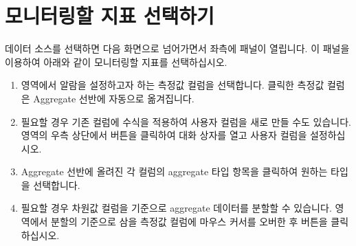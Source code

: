 \documentclass[letterpaper,10pt,english]{sphinxmanual}
\begin{document}
\section{모니터링할 지표 선택하기}
\label{\detokenize{part02/index:select-columns}}\label{\detokenize{part02/index:id3}}
데이터 소스를 선택하면 다음 화면으로 넘어가면서 좌측에  패널이 열립니다. 이 패널을 이용하여 아래와 같이 모니터링할 지표를 선택하십시오.
\begin{enumerate}
%
\item {} 
 영역에서 알람을 설정하고자 하는 측정값 컬럼을 선택합니다. 클릭한 측정값 컬럼은 Aggregate 선반에 자동으로 옮겨집니다.
\begin{quote}

\begin{figure}[H]
\centering

\noindent{}
\end{figure}
\end{quote}

\item {} 
필요할 경우 기존 컬럼에 수식을 적용하여 사용자 컬럼을 새로 만들 수도 있습니다.  영역의 우측 상단에서  버튼을 클릭하여 대화 상자를 열고 사용자 컬럼을 설정하십시오.
\begin{quote}

\begin{figure}[H]
\centering

\noindent{}
\end{figure}
\end{quote}

\item {} 
Aggregate 선반에 올려진 각 컬럼의 aggregate 타입 항목을 클릭하여 원하는 타입을 선택합니다.
\begin{quote}

\begin{figure}[H]
\centering

\noindent{}
\end{figure}
\end{quote}

\item {} 
필요할 경우 차원값 컬럼을 기준으로 aggregate 데이터를 분할할 수 있습니다.  영역에서 분할의 기준으로 삼을 측정값 컬럼에 마우스 커서를 오버한 후  버튼을 클릭하십시오.
\begin{quote}


\end{quote}
\end{enumerate}
\end{document}

